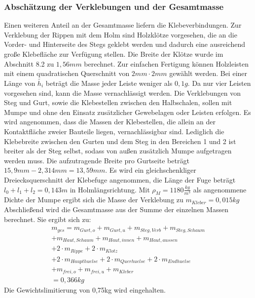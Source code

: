 \subsubsection{Abschätzung der Verklebungen und der Gesamtmasse}
Einen weiteren Anteil an der Gesamtmasse liefern die Klebeverbindungen. Zur Verklebung der Rippen mit dem Holm sind Holzklötze vorgesehen, die an die Vorder- und Hinterseite des Stegs geklebt werden und dadurch eine ausreichend große Klebefläche zur Verfügung stellen. Die Breite der Klötze wurde im Abschnitt 8.2 zu $ 1,56mm $ berechnet. Zur einfachen Fertigung können Holzleisten mit einem quadratischen Querschnitt von $ 2mm\cdot2mm $ gewählt werden. Bei einer Länge von $ \tilde{h_{i}} $ beträgt die Masse jeder Leiste weniger als $ 0,1g $. Da nur vier Leisten vorgesehen sind, kann die Masse vernachlässigt werden. Die Verklebungen von Steg und Gurt, sowie die Klebestellen zwischen den Halbschalen, sollen mit Mumpe und ohne den Einsatz zusätzlicher Gewebelagen oder Leisten erfolgen. Es wird angenommen, dass die Massen der Klebestellen, die allein an der Kontaktfläche zweier Bauteile liegen, vernachlässigbar sind. Lediglich die Klebebreite zwischen den Gurten und dem Steg in den Bereichen 1 und 2 ist breiter als der Steg selbst, sodass von außen zusätzlich Mumpe aufgetragen werden muss. Die aufzutragende Breite pro Gurtseite beträgt $ 15,9mm-2,314mm=13,59mm $. Es wird ein gleichschenkliger Dreiecksquerschnitt der Klebefuge angenommen, die Länge der Fuge beträgt $ l_{0}+l_{1}+l_{2}=0,143m $ in Holmlängsrichtung. Mit $ \rho_{M}=1180\frac{kg}{m^{3}} $ als angenommene Dichte der Mumpe ergibt sich die Masse der Verklebung zu $ m_{Kleber}=0,015kg $       \\

\noindent Abschließend wird die Gesamtmasse aus der Summe der einzelnen Massen berechnet. Sie ergibt sich zu:
\begin{equation}
\begin{array}{l}
	m_{ges}= m_{Gurt,o}+m_{Gurt,u}+m_{Steg,Verb}+m_{Steg,Schaum} \\ +m_{Haut,Schaum}+m_{Haut,innen}+m_{Haut,aussen} \\ +2\cdot m_{Rippe}+2\cdot m_{Klotz} \\
	+2\cdot m_{Haupthuelse}+2\cdot m_{Querhuelse}+2\cdot m_{Endhuelse}\\
	+m_{frei,o}+m_{frei,u}+m_{Kleber}\\
	=0,366kg
\end{array}  
\end{equation}
Die Gewichtslimitierung von 0,75kg wird eingehalten.

